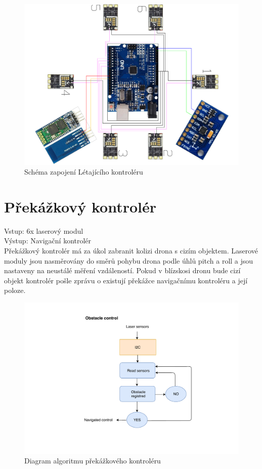 \begin{figure}[h]
	\centering
	\includegraphics[width=12cm,angle=90]{pictures/flyctrl.pdf}
	\caption{Schéma zapojení Létajícího kontroléru}
\end{figure}

\section{Překážkový kontrolér} 
Vstup: 6x laserový modul\\
Výstup: Navigační kontrolér\\

Překážkový kontrolér má za úkol zabranit kolizi drona s cizím objektem. Laserové moduly jsou nasměrovány do směrů pohybu drona podle úhlů pitch a roll a jsou nastaveny na neustálé měření vzdáleností. Pokud v blízskosi dronu bude cizí objekt kontrolér pošle zprávu o existují překážce navigačnímu kontroléru a její poloze.\\

\begin{figure}[h]
	\centering
	\includegraphics[width=18cm]{pictures/ObstacleDiagram.pdf}
	\caption{Diagram algoritmu překážkového kontroléru}
\end{figure}

